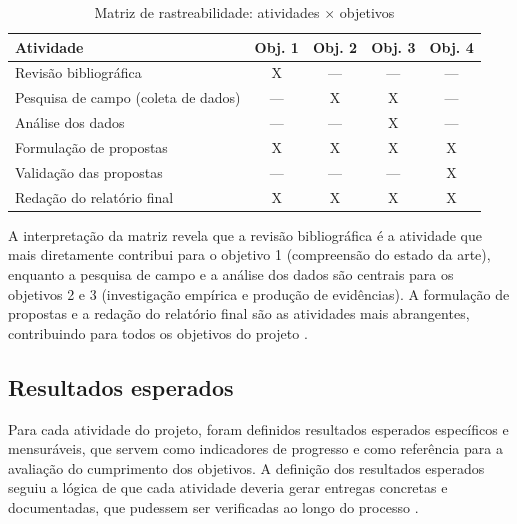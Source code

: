 \begin{table}[htbp]
    \centering
    \caption{Matriz de rastreabilidade: atividades $\times$ objetivos}
    \label{tab:rastreabilidade}
    \begin{tabular}{|p{5cm}|c|c|c|c|}
        \hline
        \textbf{Atividade} & \textbf{Obj. 1} & \textbf{Obj. 2} & \textbf{Obj. 3} & \textbf{Obj. 4} \\
        \hline
        Revisão bibliográfica & X & --- & --- & --- \\
        \hline
        Pesquisa de campo (coleta de dados) & --- & X & X & --- \\
        \hline
        Análise dos dados & --- & --- & X & --- \\
        \hline
        Formulação de propostas & X & X & X & X \\
        \hline
        Validação das propostas & --- & --- & --- & X \\
        \hline
        Redação do relatório final & X & X & X & X \\
        \hline
    \end{tabular}
\end{table}

A interpretação da matriz revela que a revisão bibliográfica é a atividade que mais diretamente contribui para o objetivo 1 (compreensão do estado da arte), enquanto a pesquisa de campo e a análise dos dados são centrais para os objetivos 2 e 3 (investigação empírica e produção de evidências). A formulação de propostas e a redação do relatório final são as atividades mais abrangentes, contribuindo para todos os objetivos do projeto \cite{SANTOS2024}.

\subsection{Resultados esperados}
\label{subsec:resultados_esperados_organizacao}

Para cada atividade do projeto, foram definidos resultados esperados específicos e mensuráveis, que servem como indicadores de progresso e como referência para a avaliação do cumprimento dos objetivos. A definição dos resultados esperados seguiu a lógica de que cada atividade deveria gerar entregas concretas e documentadas, que pudessem ser verificadas ao longo do processo \cite{BARDIN2016}.

